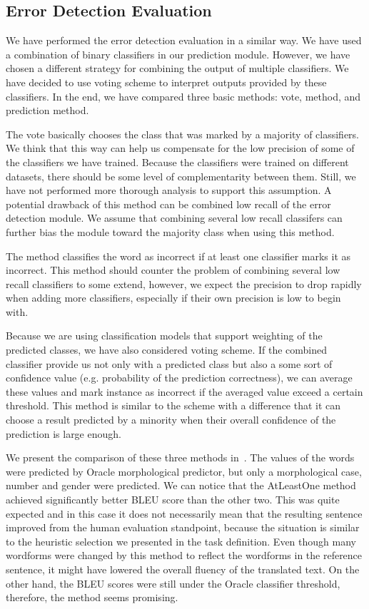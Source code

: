 \subsection{Error Detection Evaluation}

We have performed the error detection evaluation in a similar way. We have used a combination
of binary classifiers in our prediction module. However, we have chosen a different strategy
for combining the output of multiple classifiers.
We have decided to use voting scheme to interpret outputs provided by these classifiers.
In the end, we have compared three basic methods:  vote,  method,
and  prediction method.

The  vote basically chooses the class that was marked by a majority of classifiers.
We think that this way can help us compensate for the low precision of some of the classifiers we have trained.
Because the classifiers were trained on different datasets, there should be some level of complementarity
between them. Still, we have not performed more thorough analysis to support this assumption.
A potential drawback of this method can be combined low recall of the error detection module. We assume that
combining several low recall classifers can further bias the module toward the majority class when using
this method.

The  method classifies the word as incorrect if at least one classifier marks it
as incorrect. This method should counter the problem of combining several low recall classifiers to some
extend, however, we expect the precision to drop rapidly when adding more classifiers, especially if their own
precision is low to begin with.

Because we are using classification models that support weighting of the predicted classes, we have
also considered  voting scheme. If the combined classifier provide us not only with
a predicted class but also a some sort of confidence value (e.g. probability of the prediction correctness),
we can average these values and mark instance as incorrect if the averaged value exceed a certain threshold.
This method is similar to the  scheme with a difference that it can choose a result
predicted by a minority when their overall confidence of the prediction is large enough.

We present the comparison of these three methods in~. The values of the 
words were predicted by Oracle morphological predictor, but only a morphological case, number and gender were predicted.
We can notice that the AtLeastOne method achieved
significantly better BLEU score than the other two. This was quite expected and in this case it does
not necessarily mean that the resulting sentence improved from the human evaluation standpoint, because
the situation is similar to the heuristic selection we presented in the task definition. Even though
many wordforms were changed by this method to reflect the wordforms in the reference sentence, it
might have lowered the overall fluency of the translated text. On the other hand, the BLEU scores were
still under the Oracle classifier threshold, therefore, the method seems promising.


